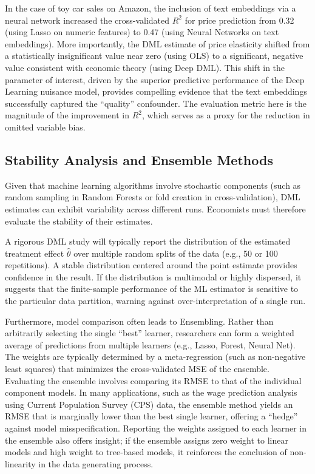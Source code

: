 \documentclass[12pt,a4paper]{article}
\begin{document}
In the case of toy car sales on Amazon, the inclusion of text embeddings via a neural network increased the cross-validated $R^2$ for price prediction from 0.32 (using Lasso on numeric features) to 0.47 (using Neural Networks on text embeddings). More importantly, the DML estimate of price elasticity shifted from a statistically insignificant value near zero (using OLS) to a significant, negative value consistent with economic theory (using Deep DML). This shift in the parameter of interest, driven by the superior predictive performance of the Deep Learning nuisance model, provides compelling evidence that the text embeddings successfully captured the ``quality'' confounder. The evaluation metric here is the magnitude of the improvement in $R^2$, which serves as a proxy for the reduction in omitted variable bias.

\subsection{Stability Analysis and Ensemble Methods}

Given that machine learning algorithms involve stochastic components (such as random sampling in Random Forests or fold creation in cross-validation), DML estimates can exhibit variability across different runs. Economists must therefore evaluate the stability of their estimates.

A rigorous DML study will typically report the distribution of the estimated treatment effect $\hat{\theta}$ over multiple random splits of the data (e.g., 50 or 100 repetitions). A stable distribution centered around the point estimate provides confidence in the result. If the distribution is multimodal or highly dispersed, it suggests that the finite-sample performance of the ML estimator is sensitive to the particular data partition, warning against over-interpretation of a single run.

Furthermore, model comparison often leads to Ensembling. Rather than arbitrarily selecting the single ``best'' learner, researchers can form a weighted average of predictions from multiple learners (e.g., Lasso, Forest, Neural Net). The weights are typically determined by a meta-regression (such as non-negative least squares) that minimizes the cross-validated MSE of the ensemble. Evaluating the ensemble involves comparing its RMSE to that of the individual component models. In many applications, such as the wage prediction analysis using Current Population Survey (CPS) data, the ensemble method yields an RMSE that is marginally lower than the best single learner, offering a ``hedge'' against model misspecification. Reporting the weights assigned to each learner in the ensemble also offers insight; if the ensemble assigns zero weight to linear models and high weight to tree-based models, it reinforces the conclusion of non-linearity in the data generating process.
\end{document}
